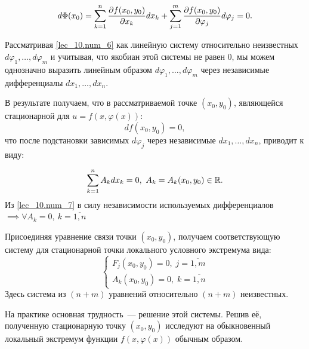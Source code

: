 \documentclass[../../main.tex]{subfiles}
\begin{document}
\begin{equation} \label{lec_10.num_6}
	d\Phi(x_0) = \sum_{k = 1}^{n} \frac{\partial  f(x_0, y_0) }{\partial x_k} 
	dx_k + \sum_{j = 1}^{m} \frac{\partial  f(x_0, y_0) }{\partial \varphi_j} d\varphi_j = 0.
\end{equation}

Рассматривая \eqref{lec_10.num_6} как линейную систему относительно неизвестных
$d\varphi_1, \ldots, d\varphi_m$ и учитывая, что якобиан 
этой системы не равен $0$,
мы можем однозначно выразить линейным образом $d\varphi_1, \dots, d\varphi_m$
через независимые дифференциалы $dx_1, \ldots, dx_n$.

В результате получаем, что в рассматриваемой точке $(x_0, y_0)$,
являющейся стационарной для $u = f\left( x, \varphi(x) \right)$:
\[ df(x_0, y_0) = 0, \]
что после подстановки зависимых $d\varphi_j$ через независимые 
$dx_1, \ldots, dx_n$, приводит к виду:

\begin{equation} \label{lec_10.num_7}
	\sum_{k = 1}^{n} A_k dx_k = 0,\ A_k = A_k(x_0, y_0) \in \mathbb{R}.
\end{equation}
Из \eqref{lec_10.num_7} в силу независимости используемых дифференциалов 
$\implies \forall A_k = 0,\ k = \overline{1, n}$

Присоединяя уравнение связи точки $(x_0, y_0)$, получаем 
соответствующую систему для стационарной точки локального 
условного экстремума вида:
\[ \begin{cases}
	F_j(x_0, y_0) = 0, \; j = \overline{1, m} \\
	A_k(x_0, y_0) = 0, \; k = \overline{1, n}
\end{cases} \]
Здесь система из $(n+m)$ уравнений относительно $(n+m)$ неизвестных.

На практике основная трудность~--- решение этой системы.
Решив её, полученную стационарную точку $(x_0, y_0)$ исследуют
на обыкновенный локальный экстремум функции $f(x, \varphi(x))$ обычным образом.
\end{document}
